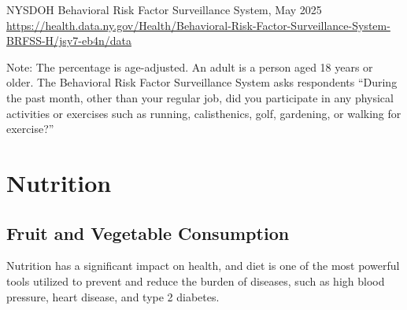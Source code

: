 \documentclass[
  english,
  letterpaper,
]{report}
\begin{document}
\begin{tcolorbox}[enhanced jigsaw, breakable, leftrule=.75mm, title=\textcolor{quarto-callout-note-color}{\faInfo}\hspace{0.5em}{Source}, bottomrule=.15mm, opacityback=0, left=2mm, colback=white, bottomtitle=1mm, coltitle=black, colbacktitle=quarto-callout-note-color!10!white, colframe=quarto-callout-note-color-frame, opacitybacktitle=0.6, toptitle=1mm, titlerule=0mm, arc=.35mm, rightrule=.15mm, toprule=.15mm]

NYSDOH Behavioral Risk Factor Surveillance System, May 2025\\
\url{https://health.data.ny.gov/Health/Behavioral-Risk-Factor-Surveillance-System-BRFSS-H/jsy7-eb4n/data}

\end{tcolorbox}

\begin{tcolorbox}[enhanced jigsaw, breakable, leftrule=.75mm, title=\textcolor{quarto-callout-note-color}{\faInfo}\hspace{0.5em}{Note}, bottomrule=.15mm, opacityback=0, left=2mm, colback=white, bottomtitle=1mm, coltitle=black, colbacktitle=quarto-callout-note-color!10!white, colframe=quarto-callout-note-color-frame, opacitybacktitle=0.6, toptitle=1mm, titlerule=0mm, arc=.35mm, rightrule=.15mm, toprule=.15mm]

Note: The percentage is age-adjusted. An adult is a person aged 18 years
or older. The Behavioral Risk Factor Surveillance System asks
respondents ``During the past month, other than your regular job, did
you participate in any physical activities or exercises such as running,
calisthenics, golf, gardening, or walking for exercise?''

\end{tcolorbox}

\section{Nutrition}\label{nutrition}

\subsection{Fruit and Vegetable
Consumption}\label{fruit-and-vegetable-consumption}

Nutrition has a significant impact on health, and diet is one of the
most powerful tools utilized to prevent and reduce the burden of
diseases, such as high blood pressure, heart disease, and type 2
diabetes.
\end{document}
